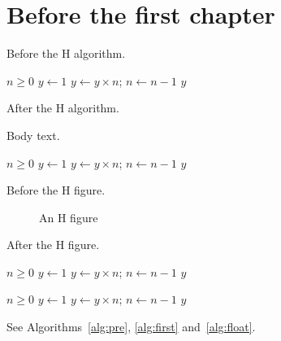 \expandafter\documentclass\expandafter[\ALGLclassoptions]{\CLS}
\newcommand\code{%
  \begin{algorithmic}[1]
  \REQUIRE $n \geq 0$
  \STATE $y \leftarrow 1$
  \WHILE{$n \neq 0$}
  \STATE $y \leftarrow y \times n$; $n \leftarrow n - 1$
  \ENDWHILE
  \RETURN $y$
  \end{algorithmic}}
\begin{document}
\ALGLname
{}

\listofalgorithms

\section*{Before the first chapter}

Before the H algorithm.
\begin{algorithm}[H]
\caption{Before the first chapter}\label{alg:pre}
\ALGLfnum{}
\code
\end{algorithm}
\ALGLnopending
After the H algorithm.


Body text.
\begin{algorithm}[H]
\caption{An H algorithm}\label{alg:first}
\ALGLfnum
\code
\end{algorithm}
\ALGLnopending

Before the H figure.
\begin{figure}[H]
\centering{}
\caption{An H figure}
\end{figure}
\ALGLnopending
After the H figure.

\begin{algorithm}
\caption{A floating algorithm}\label{alg:float}
\code
\end{algorithm}

\begin{algorithm}[p]
\caption{An algorithm on a float page}
\code
\end{algorithm}

See Algorithms~\ref{alg:pre}, \ref{alg:first} and~\ref{alg:float}.
\end{document}
